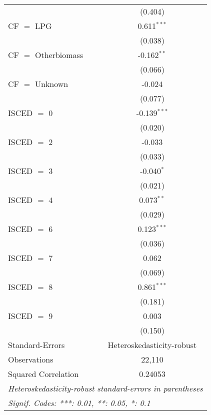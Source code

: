 \begin{table}[htbp!]
\begin{adjustbox}{width = 1\textwidth, max height = 0.95\textheight, center}
\begin{threeparttable}[b]
\begin{tabular}{lc}
                                & (0.404)\\   
            CF $=$ LPG          & 0.611$^{***}$\\   
                                & (0.038)\\   
            CF $=$ Otherbiomass & -0.162$^{**}$\\   
                                & (0.066)\\   
            CF $=$ Unknown      & -0.024\\   
                                & (0.077)\\   
            ISCED $=$ 0         & -0.139$^{***}$\\   
                                & (0.020)\\   
            ISCED $=$ 2         & -0.033\\   
                                & (0.033)\\   
            ISCED $=$ 3         & -0.040$^{*}$\\   
                                & (0.021)\\   
            ISCED $=$ 4         & 0.073$^{**}$\\   
                                & (0.029)\\   
            ISCED $=$ 6         & 0.123$^{***}$\\   
                                & (0.036)\\   
            ISCED $=$ 7         & 0.062\\   
                                & (0.069)\\   
            ISCED $=$ 8         & 0.861$^{***}$\\   
                                & (0.181)\\   
            ISCED $=$ 9         & 0.003\\   
                                & (0.150)\\   
            \midrule 
            Standard-Errors     & Heteroskedasticity-robust \\   
            Observations        & 22,110\\  
            Squared Correlation & 0.24053\\  
            \midrule \midrule
            \multicolumn{2}{l}{\emph{Heteroskedasticity-robust standard-errors in parentheses}}\\
            \multicolumn{2}{l}{\emph{Signif. Codes: ***: 0.01, **: 0.05, *: 0.1}}\\
         \end{tabular}
         

\end{threeparttable}
\end{adjustbox}
\end{table}
